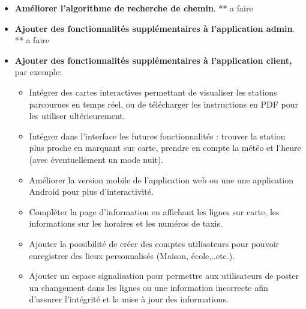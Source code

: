 \begin{itemize}
	\item \textbf{Améliorer l'algorithme de recherche de chemin}.
		** a faire	
	\item \textbf{Ajouter des fonctionnalités supplémentaires à l'application admin}.
		** a faire 
	\item \textbf{Ajouter des fonctionnalités supplémentaires à l'application client,} par exemple:
		\begin{itemize}
			\item Intégrer des cartes interactives permettant de visualiser les stations parcourues en temps réel, ou de télécharger les instructions en PDF pour les utiliser ultérieurement.
			\item Intégrer dans l'interface les futures fonctionnalités : trouver la station plus proche en marquant sur carte, prendre en compte la météo et l'heure (avec éventuellement un mode nuit).
			\item Améliorer la version mobile de l'application web ou une une application Android pour plus d'interactivité.
			\item Compléter la page d'information en affichant les lignes sur carte, les informations sur les horaires et les numéros de taxis.
			\item Ajouter la possibilité de créer des comptes utilisateurs pour pouvoir enregistrer des lieux personnalisés (Maison, école,..etc.).
			\item Ajouter un espace signalisation pour permettre aux utilisateurs de poster un changement dans les lignes ou une information incorrecte afin d'assurer l'intégrité et la mise à jour des informations.
		\end{itemize}
\end{itemize}